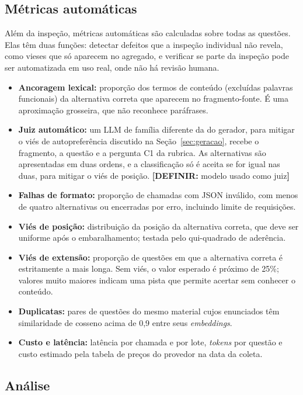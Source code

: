 \documentclass[portuguese,oneside]{tcc}
\newcommand{\estr}[1]{\emph{#1}}
\newcommand{\definir}[1]{\textcolor{orange!75!black}{\textbf{[DEFINIR:} #1\textbf{]}}}
\begin{document}
\subsection{Métricas automáticas}

Além da inspeção, métricas automáticas são calculadas sobre todas as questões. Elas têm duas funções: detectar defeitos que a inspeção individual não revela, como vieses que só aparecem no agregado, e verificar se parte da inspeção pode ser automatizada em uso real, onde não há revisão humana.

\begin{itemize}
  \item \textbf{Ancoragem lexical:} proporção dos termos de conteúdo (excluídas palavras funcionais) da alternativa correta que aparecem no fragmento-fonte. É uma aproximação grosseira, que não reconhece paráfrases.
  \item \textbf{Juiz automático:} um LLM de família diferente da do gerador, para mitigar o viés de autopreferência discutido na Seção~\ref{sec:geracao}, recebe o fragmento, a questão e a pergunta C1 da rubrica. As alternativas são apresentadas em duas ordens, e a classificação só é aceita se for igual nas duas, para mitigar o viés de posição. \definir{modelo usado como juiz}
  \item \textbf{Falhas de formato:} proporção de chamadas com JSON inválido, com menos de quatro alternativas ou encerradas por erro, incluindo limite de requisições.
  \item \textbf{Viés de posição:} distribuição da posição da alternativa correta, que deve ser uniforme após o embaralhamento; testada pelo qui-quadrado de aderência.
  \item \textbf{Viés de extensão:} proporção de questões em que a alternativa correta é estritamente a mais longa. Sem viés, o valor esperado é próximo de 25\%; valores muito maiores indicam uma pista que permite acertar sem conhecer o conteúdo.
  \item \textbf{Duplicatas:} pares de questões do mesmo material cujos enunciados têm similaridade de cosseno acima de 0,9 entre seus \estr{embeddings}.
  \item \textbf{Custo e latência:} latência por chamada e por lote, \estr{tokens} por questão e custo estimado pela tabela de preços do provedor na data da coleta.
\end{itemize}

\subsection{Análise}
\end{document}
